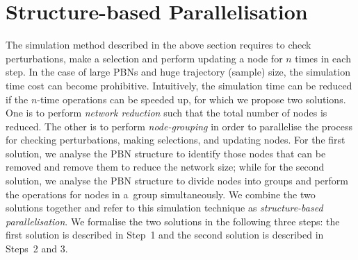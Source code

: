 \documentclass[runningheads,a4paper]{llncs}
\begin{document}

\section{Structure-based Parallelisation}
\label{sec:method}
The simulation method described in the above section requires to check perturbations,
make a selection and perform updating a node for $n$ times in each step.
In the case of large PBNs and huge trajectory (sample) size,
the simulation time cost can become prohibitive.
Intuitively,  the simulation time can be reduced if the $n$-time operations can be speeded up,
for which we propose two solutions.
One is to perform \emph{network reduction} such that the total number of nodes is reduced.
The other is to perform \emph{node-grouping} in order to parallelise the process for checking perturbations, making selections, and updating nodes.
For the first solution, we analyse the PBN structure to identify those nodes that can be removed
and remove them to reduce the network size;
while for the second solution, we analyse the PBN structure to divide nodes into groups and perform
the operations for nodes in a~group simultaneously.
We combine the two solutions together
and refer to this simulation technique as \textit{structure-based parallelisation}.
We formalise the two solutions in the following three steps:
the first solution is described in Step~1 and the second solution is described in Steps~2 and 3.
\end{document}
